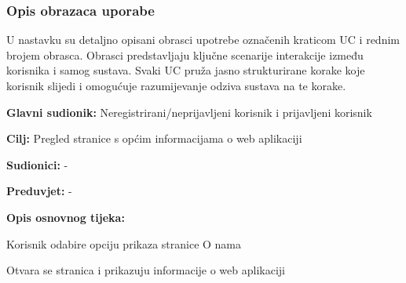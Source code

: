 \subsubsection{Opis obrazaca uporabe}

\noindent U nastavku su detaljno opisani obrasci upotrebe označenih kraticom UC i rednim brojem obrasca. Obrasci predstavljaju ključne scenarije interakcije između korisnika i samog sustava. Svaki UC pruža jasno strukturirane korake koje korisnik slijedi i omogućuje razumijevanje odziva sustava na te korake.  \\

\noindent {}
\begin{packed_item}
	
	\item \textbf{Glavni sudionik:} Neregistrirani/neprijavljeni korisnik i prijavljeni korisnik
	\item  \textbf{Cilj:} Pregled stranice s općim informacijama o web aplikaciji
	\item  \textbf{Sudionici:} -
	\item  \textbf{Preduvjet:} -
	\item  \textbf{Opis osnovnog tijeka:}
	
	\item[] \begin{packed_enum}
		
		\item Korisnik odabire opciju prikaza stranice O nama
		\item Otvara se stranica i prikazuju informacije o web aplikaciji
		
	\end{packed_enum}						
\end{packed_item}



